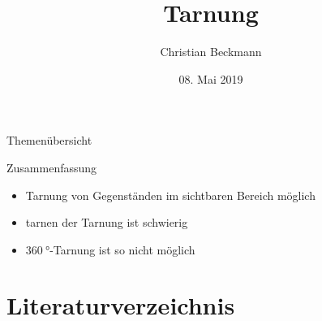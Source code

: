 \documentclass[aspectratio=169, 9pt, bibliography=totoc]{beamer}
\title{Tarnung}
\author[C.~Beckmann]{Christian Beckmann}
\institute[Seminar Moderne Optik]{Seminar Moderne Optik}
\date{08. Mai 2019}
\begin{document}
\maketitle

\begin{frame}{Themen\"ubersicht}
  \tableofcontents
\end{frame}





\begin{frame}{Zusammenfassung}
  \begin{itemize}
    \item Tarnung von Gegenständen im sichtbaren Bereich möglich
    \item tarnen der Tarnung ist schwierig
    \item $\SI{360}{\degree}$-Tarnung ist so nicht m\"oglich
  \end{itemize}
\end{frame}

\section{Literaturverzeichnis}
\begin{frame}
	\printbibliography
\end{frame}
\end{document}
